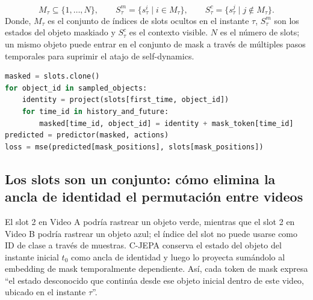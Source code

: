 

\[
M_\tau\subseteq\{1,\ldots,N\},
\qquad
S_\tau^m=\{s_\tau^i\mid i\in M_\tau\},
\qquad
S_\tau^c=\{s_\tau^j\mid j\notin M_\tau\}.
\]
Donde, $M_\tau$ es el conjunto de índices de slots ocultos en el instante $\tau$, $S_\tau^m$ son los estados del objeto maskiado y $S_\tau^c$ es el contexto visible. $N$ es el número de slots; un mismo objeto puede entrar en el conjunto de mask a través de múltiples pasos temporales para suprimir el atajo de self-dynamics.

\begin{lstlisting}[language=Python,caption={Pseudocódigo mínimo para object masking a través del tiempo}]
masked = slots.clone()
for object_id in sampled_objects:
    identity = project(slots[first_time, object_id])
    for time_id in history_and_future:
        masked[time_id, object_id] = identity + mask_token[time_id]
predicted = predictor(masked, actions)
loss = mse(predicted[mask_positions], slots[mask_positions])
\end{lstlisting}

\subsection{Los slots son un conjunto: cómo elimina la ancla de identidad el permutación entre videos}

El slot 2 en Video A podría rastrear un objeto verde, mientras que el slot 2 en Video B podría rastrear un objeto azul; el índice del slot no puede usarse como ID de clase a través de muestras. C-JEPA conserva el estado del objeto del instante inicial $t_0$ como ancla de identidad y luego lo proyecta sumándolo al embedding de mask temporalmente dependiente. Así, cada token de mask expresa ``el estado desconocido que continúa desde ese objeto inicial dentro de este video, ubicado en el instante $\tau$''.



